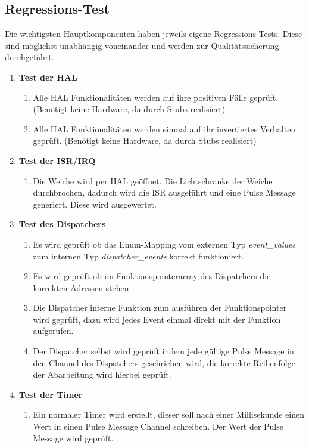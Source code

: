 \documentclass[oneside,a4paper,titlepage]{scrartcl}              %
\begin{document}
\newpage

\subsection{Regressions-Test}
Die wichtigsten Hauptkomponenten haben jeweils eigene Regressions-Tests. Diese sind möglichst unabhängig voneinander und werden zur Qualitätssicherung durchgeführt.
\begin{enumerate}
  \item \textbf{Test der HAL}
  \begin{enumerate}
    \item Alle HAL Funktionalitäten werden auf ihre positiven Fälle geprüft. (Benötigt keine Hardware, da durch Stubs realisiert)
    \item Alle HAL Funktionalitäten werden einmal auf ihr invertiertes Verhalten geprüft. (Benötigt keine Hardware, da durch Stubs realisiert)
  \end{enumerate}
  \item \textbf{Test der ISR/IRQ}
  \begin{enumerate}
    \item Die Weiche wird per HAL geöffnet. Die Lichtschranke der Weiche durchbrochen, dadurch wird die ISR ausgeführt und eine Pulse Message generiert. Diese wird ausgewertet.
  \end{enumerate}
  \item \textbf{Test des Dispatchers}
  \begin{enumerate}
    \item Es wird geprüft ob das Enum-Mapping vom externen Typ \emph{event\_values} zum internen Typ \emph{dispatcher\_events} korrekt funktioniert.
    \item Es wird geprüft ob im Funktionspointerarray des Dispatchers die korrekten Adressen stehen.
    \item Die Dispatcher interne Funktion zum ausführen der Funktionspointer wird geprüft, dazu wird jedes Event einmal direkt mit der Funktion aufgerufen.
    \item Der Dispatcher selbst wird geprüft indem jede gültige Pulse Message in den Channel des Dispatchers geschrieben wird, die korrekte Reihenfolge der Abarbeitung wird hierbei geprüft.
  \end{enumerate}
  \item \textbf{Test der Timer}
  \begin{enumerate}
    \item Ein normaler Timer wird erstellt, dieser soll nach einer Millisekunde einen Wert in einen Pulse Message Channel schreiben. Der Wert der Pulse Message wird geprüft.

\end{enumerate}
\end{enumerate}
\end{document}
